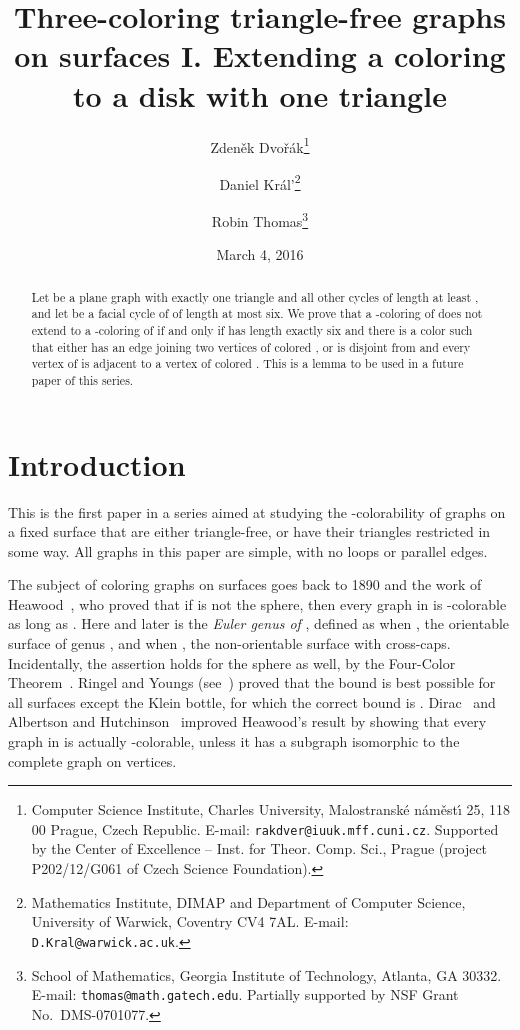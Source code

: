 \documentclass{article}
\begin{document}
\title{Three-coloring triangle-free graphs on surfaces I. 
       Extending a coloring to a disk with one triangle}
\author{Zden\v{e}k Dvo\v{r}\'ak\thanks{Computer Science Institute,
           Charles University, 
           Malostransk{\'e} n{\'a}m{\v e}st{\'\i} 25, 118 00 Prague, 
           Czech Republic. E-mail: {\tt rakdver@iuuk.mff.cuni.cz}.
           Supported by the Center of Excellence -- Inst. for Theor. Comp. Sci., Prague (project P202/12/G061 of Czech Science Foundation).}
 \and
     Daniel Kr{\'a}l'\thanks{Mathematics Institute, DIMAP and Department of Computer Science, University of Warwick, Coventry CV4 7AL. E-mail: {\tt D.Kral@warwick.ac.uk}.}
 \and
        Robin Thomas\thanks{School of Mathematics, 
        Georgia Institute of Technology, Atlanta, GA 30332. 
        E-mail: {\tt thomas@math.gatech.edu}.
        Partially supported by NSF Grant No.~DMS-0701077.}
}
\date{March 4, 2016}
\maketitle
\begin{abstract}
Let  be a plane graph with exactly one triangle  and all 
other cycles of length at least , and let  be a facial cycle of 
of length at most six.
We prove that a -coloring of  does not extend to a -coloring of  
if and only if  has length exactly six and there is a color  such that
either  has an edge joining two vertices of  colored ,
or  is disjoint from  and every vertex of  is adjacent to a vertex
of  colored .
This is a lemma to be used in a future paper of this series.
\end{abstract}

\section{Introduction}


This is the first paper in a series aimed at studying the -colorability
of graphs on a fixed surface that are either triangle-free, or have their
triangles restricted in some way.
All graphs in this paper are simple, with no loops or parallel edges.

The subject of coloring graphs on surfaces goes back to 1890 and the work
of Heawood~\cite{Heawood}, who proved that if  is not the
sphere, then every graph in 
is -colorable as long as
.
Here and later  is the {\em Euler genus of },
defined as  when , the orientable surface
of genus , and  when , the non-orientable surface
with  cross-caps.
Incidentally, the assertion holds for the sphere as well, by the
Four-Color Theorem~\cite{AppHak1,AppHakKoc,AppHak89,RobSanSeyTho4CT}.
Ringel and Youngs (see~\cite{Ringel}) proved that the bound is
best possible for all surfaces except the Klein bottle, for which
the correct bound is .
Dirac~\cite{Dirmap} and Albertson and Hutchinson~\cite{AlbHut}
improved Heawood's result by showing that
every graph in  is actually -colorable,
unless it has a subgraph isomorphic to the complete graph
on  vertices.
\end{document}
